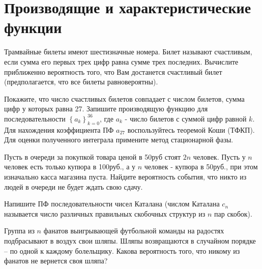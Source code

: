 \section{Производящие и характеристические функции}


\begin{problem}
Трамвайные билеты имеют шестизначные номера. Билет называют счастливым, если 
сумма его первых трех цифр равна сумме трех последних. Вычислите приближенно 
вероятность того, что Вам достанется счастливый билет (предполагается, что 
все билеты равновероятны).

\end{problem}

\begin{ordre}
Покажите, что число счастливых билетов совпадает с числом билетов, 
сумма цифр у которых равна 27. Запишите производящую функцию для 
последовательности $\left\{ {a_k } \right\}_{k=0}^{36} $, где $a_k $ - число 
билетов с суммой цифр равной $k$. Для нахождения коэффициента ПФ $a_{27} $ 
воспользуйтесь теоремой Коши (ТФКП). Для оценки полученного интеграла примените 
метод стационарной фазы.
\end{ordre}

\begin{problem}
Пусть в очереди за покупкой товара ценой в 
50руб стоят $2n$ человек. Пусть у $n$ человек есть только купюра в 100руб., 
а у $n$ человек - купюра в 50руб., при этом изначально касса магазина пуста. 
Найдите вероятность события, что никто из людей в очереди не будет ждать 
свою сдачу.
\end{problem}

\begin{ordre}
Напишите ПФ последовательности чисел Каталана (числом Каталана 
$c_n $ называется число различных правильных скобочных структур из $n$ пар 
скобок).
\end{ordre}


\begin{problem}
Группа из $n$ фанатов выигрывающей футбольной команды на радостях 
подбрасывают в воздух свои шляпы. Шляпы возвращаются в случайном порядке -- 
по одной к каждому болельщику. Какова вероятность того, что никому из 
фанатов не вернется своя шляпа?
\end{problem}

